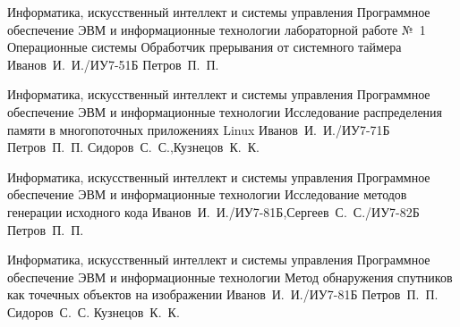 \documentclass{bmstu}
\begin{document}



\makereporttitle
    {Информатика, искусственный интеллект и системы управления} %
    {Программное обеспечение ЭВМ и информационные технологии} %
    {лабораторной работе №~1} %
    {Операционные системы} %
    {Обработчик прерывания от системного таймера} %
    {} %
    {Иванов~И.~И./ИУ7-51Б} %
    {Петров~П.~П.} %


\makecourseworktitle
    {Информатика, искусственный интеллект и системы управления} %
    {Программное обеспечение ЭВМ и информационные технологии} %
    {Исследование распределения памяти в многопоточных приложениях Linux} %
    {Иванов~И.~И./ИУ7-71Б} %
    {Петров~П.~П.} %
    {Сидоров~С.~С.,Кузнецов~К.~К.} %


\makeresearchtitle
    {Информатика, искусственный интеллект и системы управления} %
    {Программное обеспечение ЭВМ и информационные технологии} %
    {Исследование методов генерации исходного кода} %
    {Иванов~И.~И./ИУ7-81Б,Сергеев~С.~С./ИУ7-82Б} %
    {Петров~П.~П.} %
    {} %


\makethesistitle
    {Информатика, искусственный интеллект и системы управления} %
    {Программное обеспечение ЭВМ и информационные технологии} %
    {Метод обнаружения спутников как точечных объектов на изображении} %
    {Иванов~И.~И./ИУ7-81Б} %
    {Петров~П.~П.} %
    {Сидоров~С.~С.} %
    {Кузнецов~К.~К.} %
\end{document}
